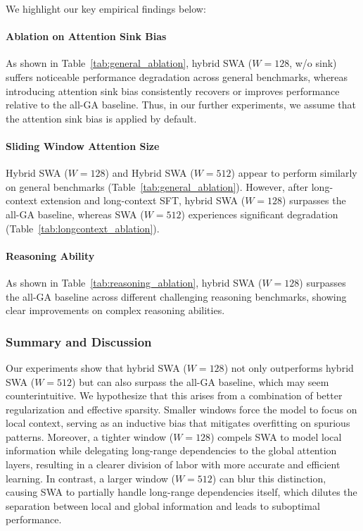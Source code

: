 We highlight our key empirical findings below:
   

\paragraph{Ablation on Attention Sink Bias} As shown in Table~\ref{tab:general_ablation}, hybrid SWA ($W = 128$, w/o sink) suffers noticeable performance degradation across general benchmarks, whereas introducing attention sink bias consistently recovers or improves performance relative to the all-GA baseline. Thus, in our further experiments, we assume that the attention sink bias is applied by default. 

\paragraph{Sliding Window Attention Size} Hybrid SWA ($W = 128$) and Hybrid SWA ($W = 512$) appear to perform similarly on general benchmarks (Table~\ref{tab:general_ablation}). However, after long-context extension and long-context SFT, hybrid SWA ($W = 128$) surpasses the all-GA baseline, whereas SWA ($W = 512$) experiences significant degradation (Table~\ref{tab:longcontext_ablation}). 

\paragraph{Reasoning Ability} As shown in Table~\ref{tab:reasoning_ablation}, hybrid SWA ($W = 128$) surpasses the all-GA baseline across different challenging reasoning benchmarks, showing clear improvements on complex reasoning abilities.


\subsubsection{Summary and Discussion}
Our experiments show that hybrid SWA ($W = 128$) not only outperforms hybrid SWA ($W = 512$) but can also surpass the all-GA baseline, which may seem counterintuitive. We hypothesize that this arises from a combination of better regularization and effective sparsity. Smaller windows force the model to focus on local context, serving as an inductive bias that mitigates overfitting on spurious patterns. Moreover, a tighter window ($W = 128$) compels SWA to model local information while delegating long-range dependencies to the global attention layers, resulting in a clearer division of labor with more accurate and efficient learning. In contrast, a larger window ($W = 512$) can blur this distinction, causing SWA to partially handle long-range dependencies itself, which dilutes the separation between local and global information and leads to suboptimal performance.

